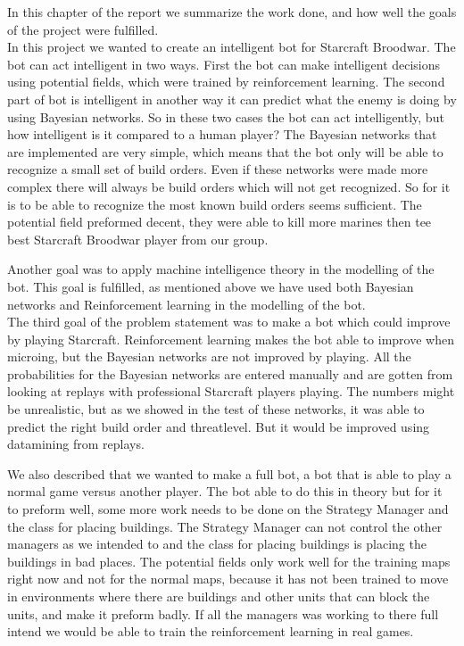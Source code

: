 In this chapter of the report we summarize the work done, and how well the goals of the project were fulfilled. \\

In this project we wanted to create an intelligent bot for Starcraft Broodwar. The bot can act intelligent in two ways. First the bot can make intelligent decisions using potential fields, which were trained by reinforcement learning. The second part of bot is intelligent in another way  it can predict what the enemy is doing by using Bayesian networks. 
So in these two cases the bot can act intelligently, but how intelligent is it compared to a human player? The Bayesian networks that are implemented are very simple, which means that the bot only will be able to recognize a small set of build orders. Even if these networks were made more complex there will always be build orders which will not get recognized. So for it is to be able to recognize the most known build orders seems sufficient. The potential field preformed decent, they were able to kill more marines then tee best Starcraft Broodwar player from our group.

Another goal was to apply machine intelligence theory in the modelling of the bot. This goal is fulfilled, as mentioned above we have used both 
Bayesian networks and Reinforcement learning in the modelling of the bot.\\

The third goal of the problem statement was to make a bot which could improve by playing Starcraft. 
Reinforcement learning makes the bot able to improve when microing, but the Bayesian networks are not improved by playing. All the probabilities for the Bayesian networks are entered manually and are gotten from looking at replays with professional Starcraft players playing. The numbers might be unrealistic, but as we showed in the test of these networks, it was able to predict the right build order and threatlevel. But it would be improved using datamining from replays.

We also described that we wanted to make a full bot, a bot that is able to play a normal game versus another player. The bot able to do this in theory but for it to preform well, some more work needs to be done on the Strategy Manager and the class for placing buildings. The Strategy Manager can not control the other managers as we intended to and the class for placing buildings is placing the buildings in bad places. The potential fields only work well for the training maps right now and not for the normal maps, because it has not been trained to move in environments where there are buildings and other units that can block the units, and make it preform badly. If all the managers was working to there full intend we would be able to train the reinforcement learning in real games.
